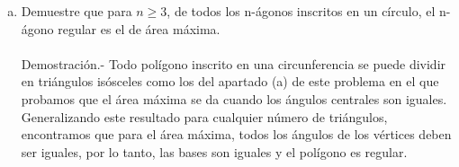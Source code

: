 \begin{enumerate}[\bfseries 1.]
\begin{enumerate}[(a)]
	    \item Demuestre que para $n\geq 3$, de todos los n-ágonos inscritos en un círculo, el n-ágono regular es el de área máxima.\\\\
		Demostración.-\; Todo polígono inscrito en una circunferencia se puede dividir en triángulos isósceles como los del apartado (a) de este problema en el que probamos que el área máxima se da cuando los ángulos centrales son iguales.\\
		Generalizando este resultado para cualquier número de triángulos, encontramos que para el área máxima, todos los ángulos de los vértices deben ser iguales, por lo tanto, las bases son iguales y el polígono es regular.\\\\

	\end{enumerate}


\end{enumerate}
